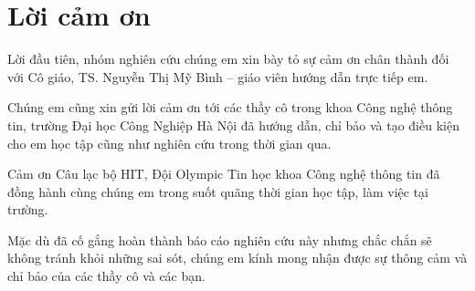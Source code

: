 \documentclass[envcountsame,envcountchap, openany, 14pt]{mysvmono2}
\begin{document}
\frontmatter%
\mainmatter%


\section*{\centering Lời cảm ơn}

Lời đầu tiên, nhóm nghiên cứu chúng em xin bày tỏ sự cảm ơn chân thành đối với Cô giáo, TS.
Nguyễn Thị Mỹ Bình – giáo viên hướng dẫn trực tiếp em.

Chúng em cũng xin gửi lời cảm ơn tới các thầy cô trong khoa Công nghệ thông tin,
trường Đại học Công Nghiệp Hà Nội đã hướng dẫn, chỉ bảo và tạo điều kiện cho em
học tập cũng như nghiên cứu trong thời gian qua.

Cảm ơn Câu lạc bộ HIT, Đội Olympic Tin học khoa Công nghệ thông tin đã đồng hành
cùng chúng em trong suốt quãng thời gian học tập, làm việc tại trường.

Mặc dù đã cố gắng hoàn thành báo cáo nghiên cứu này nhưng chắc chắn
sẽ không tránh khỏi những sai sót, chúng em kính mong nhận được sự thông cảm và chỉ
bảo của các thầy cô và các bạn.

\tableofcontents







% 

\backmatter%
\medskip



\end{document}

